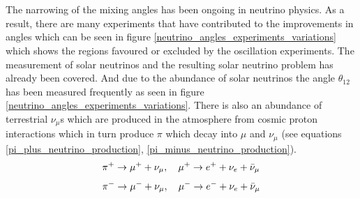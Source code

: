 \\\\The narrowing of the mixing angles has been ongoing in neutrino physics. As a result, there are many experiments that have contributed to the improvements in angles which can be seen in figure \ref{neutrino_angles_experiments_variations} 
 which shows the regions favoured or excluded by the oscillation experiments. The measurement of solar neutrinos and the resulting solar neutrino problem has already been covered. And due to the abundance of solar neutrinos the angle $\theta_{12}$ has been measured frequently as seen in figure \ref{neutrino_angles_experiments_variations}. There is also an abundance of terrestrial $\nu_\mu$s which are produced in the atmosphere from cosmic proton interactions which in turn produce $\pi$ which decay into $\mu$ and $\nu_\mu$ \cite{griffiths2008book}\cite{griffiths2008neutrinoOscillations} (see equations \ref{pi_plus_neutrino_production}, \ref{pi_minus_neutrino_production}).
\begin{equation}
    \pi^+ \rightarrow \mu^+ + \nu_\mu,\quad \mu^+ \rightarrow e^+ + \nu_e + \Bar{\nu}_\mu 
    \label{pi_plus_neutrino_production}
\end{equation}
\begin{equation}
    \pi^- \rightarrow \mu^- + \nu_\mu, \quad \mu^- \rightarrow e^- + \nu_e + \Bar{\nu}_\mu 
    \label{pi_minus_neutrino_production}
\end{equation}
